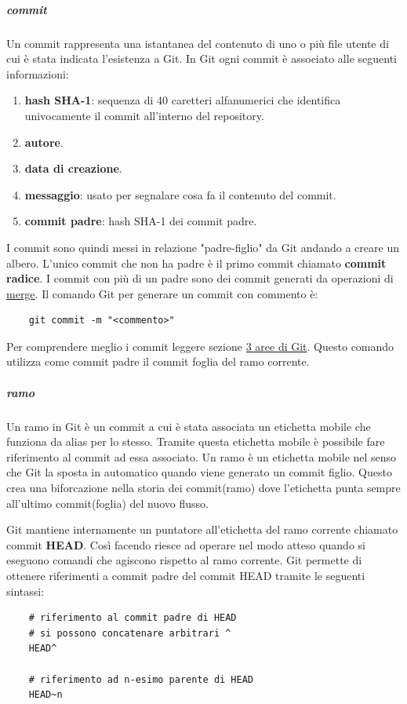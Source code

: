 \subparagraph{commit}
\label{subpar:commit}
Un commit rappresenta una istantanea del contenuto di uno o più file utente di cui è stata indicata l'esistenza a Git.
In Git ogni commit è associato alle seguenti informazioni:
\begin{enumerate}
    \item \textbf{hash SHA-1}: sequenza di 40 caretteri alfanumerici che identifica univocamente il commit all'interno del repository.
    \item \textbf{autore}.
    \item \textbf{data di creazione}.
    \item \textbf{messaggio}: usato per segnalare cosa fa il contenuto del commit.
    \item \textbf{commit padre}: hash SHA-1 dei commit padre.
\end{enumerate}
I commit sono quindi messi in relazione "padre-figlio" da Git andando a creare un albero.
L'unico commit che non ha padre è il primo commit chiamato \textbf{commit radice}.
I commit con più di un padre sono dei commit generati da operazioni di \hyperref[subpar:merge]{merge}.
Il comando Git per generare un commit con commento è:
\begin{lstlisting}
    git commit -m "<commento>"
\end{lstlisting}
Per comprendere meglio i commit leggere sezione \hyperref[subpar:3_aree_git]{3 aree di Git}.
Questo comando utilizza come commit padre il commit foglia del ramo corrente. 

\subparagraph{ramo}
\label{subpar:branch}
Un ramo in Git è un commit a cui è stata associata un etichetta mobile che funziona da alias per lo stesso.
Tramite questa etichetta mobile è possibile fare riferimento al commit ad essa associato.
Un ramo è un etichetta mobile nel senso che Git la sposta in automatico quando viene generato un commit figlio.
Questo crea una biforcazione nella storia dei commit(ramo) dove l'etichetta punta sempre all'ultimo commit(foglia) del nuovo flusso.

Git mantiene internamente un puntatore all'etichetta del ramo corrente chiamato commit \textbf{HEAD}.
Così facendo riesce ad operare nel modo atteso quando si eseguono comandi che agiscono rispetto al ramo corrente.
Git permette di ottenere riferimenti a commit padre del commit HEAD tramite le seguenti sintassi:
\begin{lstlisting}
    # riferimento al commit padre di HEAD
    # si possono concatenare arbitrari ^
    HEAD^

    # riferimento ad n-esimo parente di HEAD
    HEAD~n
\end{lstlisting}
 

